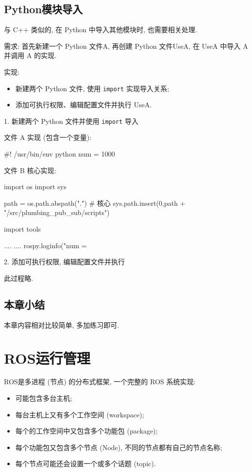 \documentclass[openany, fontset=windowsold]{ctexbook}
\theoremstyle{kaiti}
\theoremstyle{normal}
\begin{document}
\section{Python模块导入}

与 C++ 类似的, 在 Python 中导入其他模块时, 也需要相关处理.

需求: 首先新建一个 Python 文件A, 再创建 Python 文件UseA, 在 UseA 中导入 A 并调用 A 的实现.

实现:

\begin{itemize}
  \item 新建两个 Python 文件, 使用 \verb|import| 实现导入关系; 
  \item 添加可执行权限、编辑配置文件并执行 UseA.
\end{itemize}

1. 新建两个 Python 文件并使用 \verb|import| 导入

文件 A 实现 (包含一个变量):

\begin{python}
  #! /usr/bin/env python
  num = 1000
\end{python}

文件 B 核心实现:

\begin{python}
  import os
  import sys

  path = os.path.abspath(".")
  # 核心
  sys.path.insert(0,path + "/src/plumbing_pub_sub/scripts")

  import tools

  ....
  ....
      rospy.loginfo("num = %
\end{python}

2. 添加可执行权限, 编辑配置文件并执行

此过程略.

\section{本章小结}

本章内容相对比较简单, 多加练习即可.

\chapter{ROS运行管理}
\label{chapter:ros_run_management}

ROS是多进程 (节点) 的分布式框架, 一个完整的 ROS 系统实现: 

\begin{itemize}
  \item 可能包含多台主机; 
  \item 每台主机上又有多个工作空间 (workspace); 
  \item 每个的工作空间中又包含多个功能包 (package); 
  \item 每个功能包又包含多个节点 (Node), 不同的节点都有自己的节点名称; 
  \item 每个节点可能还会设置一个或多个话题 (topic).
\end{itemize}
\end{document}
